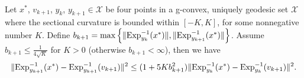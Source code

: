 \begin{theorem} \label{thm:squared-distance-ratio-bound}\\
	Let $x^*$, $v_{k+1}$, $y_k$, $y_{k+1}\in\mathcal{X}$ be four points in a g-convex, uniquely geodesic set $\mathcal{X}$ where the sectional curvature is bounded within $[-K, K]$, for some nonnegative number $K$.
	Define $b_{k+1}=\max\left\{\|\mathrm{Exp}_{y_k}^{-1}(x^*)\|,\|\mathrm{Exp}_{y_{k+1}}^{-1}(x^*)\|\right\}$. Assume $b_{k+1}\le\frac{1}{4\sqrt{K}}$ for $K>0$ (otherwise $b_{k+1} < \infty$), then we have 
	\begin{equation}
	\|\mathrm{Exp}_{y_{k+1}}^{-1}(x^*)-\mathrm{Exp}_{y_{k+1}}^{-1}(v_{k+1})\|^2 \le (1+5K b_{k+1}^2) \|\mathrm{Exp}_{y_k}^{-1}(x^*)-\mathrm{Exp}_{y_k}^{-1}(v_{k+1})\|^2.
	\end{equation}
\end{theorem}

